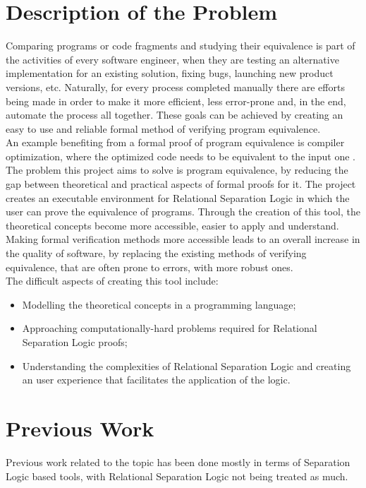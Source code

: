 \documentclass[12pt,a4paper]{article}
\begin{document}
\section{Description of the Problem}
Comparing programs or code fragments and studying their equivalence is part of the activities of every software engineer, when they are testing an alternative implementation for an existing solution, fixing bugs, launching new product versions, etc. Naturally, for every process completed manually there are efforts being made in order to make it more efficient, less error-prone and, in the end, automate the process all together. These goals can be achieved by creating an easy to use and reliable formal  method of verifying program equivalence.
\\

An example benefiting from a formal proof of program equivalence is compiler optimization, where the optimized code needs to be equivalent to the input one \cite{relational}.\\

The problem this project aims to solve is program equivalence, by reducing the gap between theoretical and practical aspects of formal proofs for it. The project creates an executable environment for Relational Separation Logic in which the user can prove the equivalence of programs. Through the creation of this tool, the theoretical concepts become more accessible, easier to apply and understand. Making formal verification methods more accessible leads to an overall increase in the quality of software, by replacing the existing methods of verifying equivalence, that are often prone to errors, with more robust ones.\\

The difficult aspects of creating this tool include:
\begin{itemize}
	\item Modelling the theoretical concepts in a programming language;
	\item Approaching computationally-hard problems required for Relational Separation Logic proofs;
	\item Understanding the complexities of Relational Separation Logic and creating an user experience that facilitates the application of the logic.
\end{itemize}

\section{Previous Work}
Previous work related to the topic has been done mostly in terms of Separation Logic based tools, with Relational Separation Logic not being treated as much. \\
\end{document}
